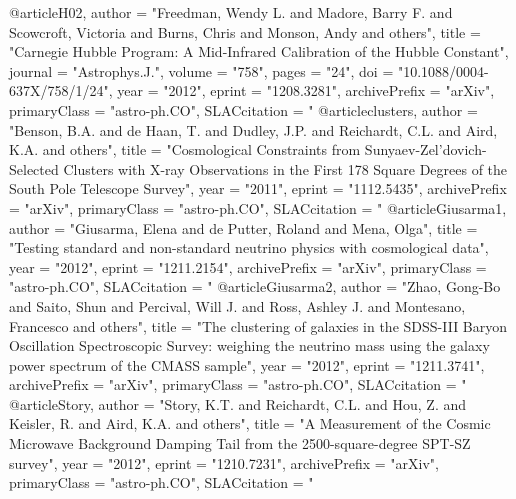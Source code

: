 @article{H02,
      author         = "Freedman, Wendy L. and Madore, Barry F. and Scowcroft,
                        Victoria and Burns, Chris and Monson, Andy and others",
      title          = "{Carnegie Hubble Program: A Mid-Infrared Calibration of
                        the Hubble Constant}",
      journal        = "Astrophys.J.",
      volume         = "758",
      pages          = "24",
      doi            = "10.1088/0004-637X/758/1/24",
      year           = "2012",
      eprint         = "1208.3281",
      archivePrefix  = "arXiv",
      primaryClass   = "astro-ph.CO",
      SLACcitation   = "%
}
@article{clusters,
      author         = "Benson, B.A. and de Haan, T. and Dudley, J.P. and
                        Reichardt, C.L. and Aird, K.A. and others",
      title          = "{Cosmological Constraints from
                        Sunyaev-Zel'dovich-Selected Clusters with X-ray
                        Observations in the First 178 Square Degrees of the South
                        Pole Telescope Survey}",
      year           = "2011",
      eprint         = "1112.5435",
      archivePrefix  = "arXiv",
      primaryClass   = "astro-ph.CO",
      SLACcitation   = "%
}
@article{Giusarma1,
      author         = "Giusarma, Elena and de Putter, Roland and Mena, Olga",
      title          = "{Testing standard and non-standard neutrino physics with
                        cosmological data}",
      year           = "2012",
      eprint         = "1211.2154",
      archivePrefix  = "arXiv",
      primaryClass   = "astro-ph.CO",
      SLACcitation   = "%
}
@article{Giusarma2,
      author         = "Zhao, Gong-Bo and Saito, Shun and Percival, Will J. and
                        Ross, Ashley J. and Montesano, Francesco and others",
      title          = "{The clustering of galaxies in the SDSS-III Baryon
                        Oscillation Spectroscopic Survey: weighing the neutrino
                        mass using the galaxy power spectrum of the CMASS sample}",
      year           = "2012",
      eprint         = "1211.3741",
      archivePrefix  = "arXiv",
      primaryClass   = "astro-ph.CO",
      SLACcitation   = "%
}
@article{Story,
      author         = "Story, K.T. and Reichardt, C.L. and Hou, Z. and Keisler,
                        R. and Aird, K.A. and others",
      title          = "{A Measurement of the Cosmic Microwave Background Damping
                        Tail from the 2500-square-degree SPT-SZ survey}",
      year           = "2012",
      eprint         = "1210.7231",
      archivePrefix  = "arXiv",
      primaryClass   = "astro-ph.CO",
      SLACcitation   = "%
}
